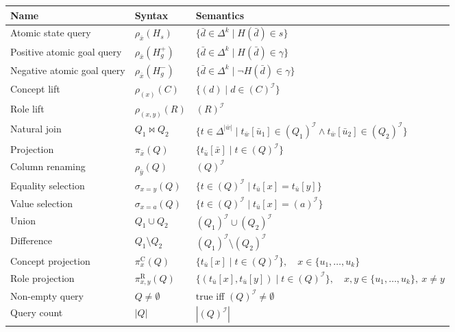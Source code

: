 \documentclass[11pt]{article}
\newcommand{\I}{\mathcal{I}}
\newcommand{\sem}[1]{\left(#1\right)^{\I}}
\newenvironment{compacttable}
  {\begingroup\setlength{\tabcolsep}{3pt}}
  {\endgroup}
\begin{document}
\begin{compacttable}
\begin{longtable}{>{\raggedright\arraybackslash}p{}
                  >{\centering\arraybackslash}p{}
                  >{\raggedright\arraybackslash}p{}}
\toprule
Name & Syntax & Semantics \\
\midrule
\endhead
Atomic state query &
$\rho_{\bar x}(H_s)$ &
$\{\bar d\in\Delta^k\mid H(\bar d)\in s\}$ \\
Positive atomic goal query &
$\rho_{\bar x}(H_g^+)$ &
$\{\bar d\in\Delta^k\mid H(\bar d)\in\gamma\}$ \\
Negative atomic goal query &
$\rho_{\bar x}(H_g^-)$ &
$\{\bar d\in\Delta^k\mid\neg H(\bar d)\in\gamma\}$ \\
Concept lift &
$\rho_{(x)}(C)$ &
$\{(d)\mid d\in\sem{C}\}$ \\
Role lift &
$\rho_{(x,y)}(R)$ &
$\sem{R}$ \\
Natural join &
$Q_1\bowtie Q_2$ &
$\{t\in\Delta^{|\bar w|}\mid t_{\bar w}[\bar u_1]\in\sem{Q_1}\land t_{\bar w}[\bar u_2]\in\sem{Q_2}\}$ \\
Projection &
$\pi_{\bar x}(Q)$ &
$\{t_{\bar u}[\bar x]\mid t\in\sem{Q}\}$ \\
Column renaming &
$\rho_{\bar y}(Q)$ &
$\sem{Q}$ \\
Equality selection &
$\sigma_{x=y}(Q)$ &
$\{t\in\sem{Q}\mid t_{\bar u}[x]=t_{\bar u}[y]\}$ \\
Value selection &
$\sigma_{x=a}(Q)$ &
$\{t\in\sem{Q}\mid t_{\bar u}[x]=\sem{a}\}$ \\
Union &
$Q_1\cup Q_2$ &
$\sem{Q_1}\cup\sem{Q_2}$ \\
Difference &
$Q_1\setminus Q_2$ &
$\sem{Q_1}\setminus\sem{Q_2}$ \\
\midrule
Concept projection &
$\pi^{\mathrm C}_{x}(Q)$ &
$\{t_{\bar u}[x]\mid t\in\sem{Q}\},\quad x\in\{u_1,\ldots,u_k\}$ \\
Role projection &
$\pi^{\mathrm R}_{x,y}(Q)$ &
$\{(t_{\bar u}[x],t_{\bar u}[y])\mid t\in\sem{Q}\},\quad x,y\in\{u_1,\ldots,u_k\},\ x\neq y$ \\
Non-empty query &
$Q\neq\emptyset$ &
$\mathrm{true}$ iff $\sem{Q}\neq\emptyset$ \\
Query count &
$|Q|$ &
$|\sem{Q}|$ \\
\bottomrule
\end{longtable}
\end{compacttable}
\end{document}
